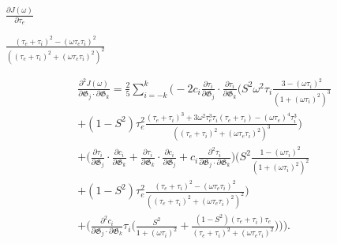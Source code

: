 \documentclass[a4paper,11pt,twoside,openright]{book}
\def\lthtmlcheckvsize{\ifdim\ht\sizebox<\vsize 
  \ifdim\wd\sizebox<\hsize\expandafter\hfill\fi \expandafter\vfill
  \else\expandafter\vss\fi}%
\begin{document}
{\newpage\clearpage
{}%
$\displaystyle {\frac{{\partial J(\omega)}}{{\partial \tau_e}}}$%
\lthtmlindisplaymathZ
\lthtmlcheckvsize\clearpage}

{\newpage\clearpage
{}%
$\displaystyle {\frac{{(\tau_e + \tau_i)^2 - (\omega \tau_e \tau_i)^2}}{{\left((\tau_e + \tau_i)^2 + (\omega \tau_e \tau_i)^2 \right)^2}}}$%
\lthtmlindisplaymathZ
\lthtmlcheckvsize\clearpage}

{\newpage\clearpage
{}%
\begin{multline}
    \frac{\partial^2 J(\omega)}{\partial \mathfrak{G}_j \cdot \partial \mathfrak{G}_k} = \frac{2}{5} \sum_{i=-k}^k \Bigg(
        -2 c_i \frac{\partial \tau_i}{\partial \mathfrak{G}_j} \cdot \frac{\partial \tau_i}{\partial \mathfrak{G}_k} \Bigg(
            S^2 \omega^2 \tau_i \frac{3 - (\omega \tau_i)^2}{\left(1 + (\omega \tau_i)^2 \right)^3}  \\
            + (1 - S^2) \tau_e^2 \frac{(\tau_e + \tau_i)^3  +  3 \omega^2 \tau_e^3 \tau_i (\tau_e + \tau_i)  -  (\omega \tau_e)^4 \tau_i^3}
                {\left((\tau_e + \tau_i)^2 + (\omega \tau_e \tau_i)^2 \right)^3}
        \Bigg) \\
        + \Bigg(
            \frac{\partial \tau_i}{\partial \mathfrak{G}_j} \cdot \frac{\partial c_i}{\partial \mathfrak{G}_k}
            + \frac{\partial \tau_i}{\partial \mathfrak{G}_k} \cdot \frac{\partial c_i}{\partial \mathfrak{G}_j}
            + c_i \frac{\partial^2 \tau_i}{\partial \mathfrak{G}_j \cdot \partial \mathfrak{G}_k}
        \Bigg)
        \Bigg(
            S^2 \frac{1 - (\omega \tau_i)^2}{\left(1 + (\omega \tau_i)^2 \right)^2} \\
            + (1 - S^2) \tau_e^2 \frac{(\tau_e + \tau_i)^2 - (\omega \tau_e \tau_i)^2}{\left((\tau_e + \tau_i)^2 + (\omega \tau_e \tau_i)^2 \right)^2}
        \Bigg) \\
        + \Bigg(
            \frac{\partial^2 c_i}{\partial \mathfrak{G}_j \cdot \partial \mathfrak{G}_k} \tau_i \Bigg(
                \frac{S^2}{1 + (\omega \tau_i)^2}
                + \frac{(1 - S^2)(\tau_e + \tau_i)\tau_e}{(\tau_e + \tau_i)^2 + (\omega \tau_e \tau_i)^2}
            \Bigg)
        \Bigg)
    \Bigg).
\end{multline}%
\lthtmldisplayZ
\lthtmlcheckvsize\clearpage}
\end{document}
